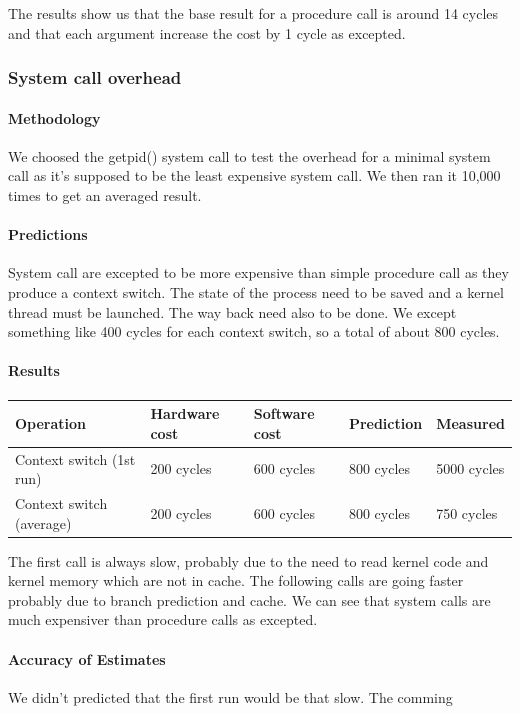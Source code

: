 The results show us that the base result for a procedure call is around 14
cycles and that each argument increase the cost by 1 cycle as excepted.

\subsubsection{System call overhead}
\paragraph{Methodology}
We choosed the getpid() system call to test the overhead for a minimal system
call as it's supposed to be the least expensive system call.
We then ran it 10,000 times to get an averaged result.

\paragraph{Predictions}
System call are excepted to be more expensive than simple procedure call as they
produce a context switch.
The state of the process need to be saved and a kernel thread must be launched.
The way back need also to be done.
We except something like 400 cycles for each context switch, so a total of about 800 cycles.

\paragraph{Results}

\begin{tabular}{| l | l | l | l | l |}
\hline
Operation & Hardware cost & Software cost & Prediction & Measured \\
\hline
Context switch (1st run) & 200 cycles & 600 cycles & 800 cycles & 5000 cycles\\
\hline
Context switch (average) & 200 cycles & 600 cycles & 800 cycles & 750 cycles\\
\hline
\end{tabular}

The first call is always slow, probably due to the need to read kernel code and
kernel memory which are not in cache.
The following calls are going faster probably due to branch prediction and
cache.
We can see that system calls are much expensiver than procedure calls as
excepted.

\paragraph{Accuracy of Estimates}
We didn't predicted that the first run would be that slow.
The comming 

